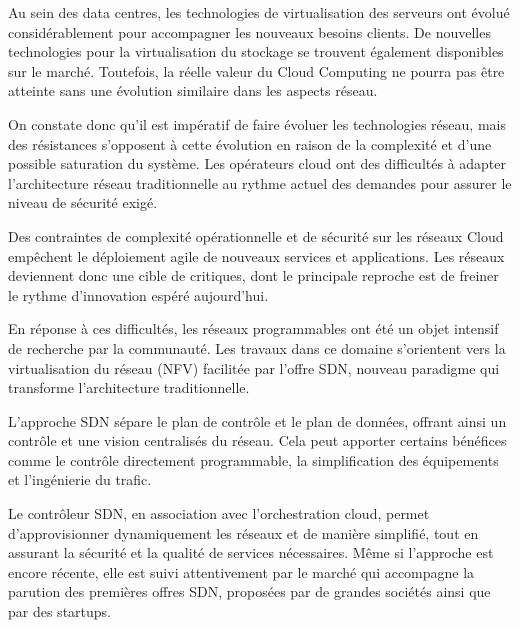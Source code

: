 

Au sein des data centres, les technologies de virtualisation des serveurs ont évolué considérablement pour accompagner les nouveaux besoins clients. De nouvelles technologies pour la virtualisation du stockage se trouvent également disponibles sur le marché. Toutefois, la réelle valeur du Cloud Computing ne pourra pas être atteinte sans une évolution similaire dans les aspects réseau.

On constate donc qu'il est impératif de faire évoluer les technologies réseau, mais des résistances s'opposent à cette évolution en raison de la complexité et d'une possible saturation du système. Les opérateurs cloud ont des difficultés à adapter l'architecture réseau traditionnelle au rythme actuel des demandes pour assurer le niveau de sécurité exigé.

Des contraintes de complexité opérationnelle et de sécurité sur les réseaux Cloud empêchent le déploiement agile de nouveaux services et applications. Les réseaux deviennent donc une cible de critiques, dont le principale reproche est de freiner le rythme d'innovation espéré aujourd'hui.

En réponse à ces difficultés, les réseaux programmables ont été un objet intensif de recherche par la communauté. Les travaux dans ce domaine s'orientent vers la virtualisation du réseau (NFV) facilitée par l'offre SDN, nouveau paradigme qui transforme l'architecture traditionnelle. 

L'approche SDN sépare le plan de contrôle et le plan de données, offrant ainsi un contrôle et une vision centralisés du réseau. Cela peut apporter certains bénéfices comme le contrôle directement programmable, la simplification des équipements et l'ingénierie du trafic. %


Le contrôleur SDN, en association avec l'orchestration cloud, permet d'approvisionner dynamiquement les réseaux et de manière simplifié, tout en assurant la sécurité et la qualité de services nécessaires. Même si l'approche est encore récente, elle est suivi attentivement par le marché qui accompagne la parution des premières offres SDN, proposées par de grandes sociétés ainsi que par des startups.



